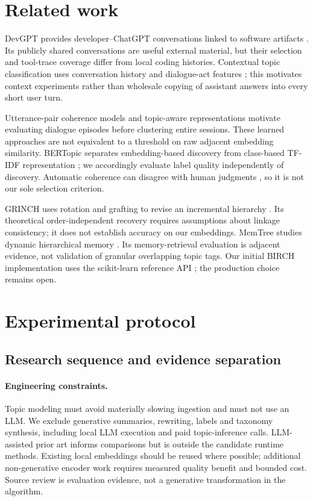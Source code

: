 \documentclass[11pt]{article}
\begin{document}
\section{Related work}
DevGPT provides developer--ChatGPT conversations linked to software artifacts
\cite{devgpt}. Its publicly shared conversations are useful external material,
but their selection and tool-trace coverage differ from local coding histories.
Contextual topic classification uses conversation history and dialogue-act
features \cite{khatri}; this motivates context experiments rather than wholesale
copying of assistant answers into every short user turn.

Utterance-pair coherence models \cite{xing} and topic-aware representations
\cite{gao} motivate evaluating dialogue episodes before clustering entire
sessions. These learned approaches are not equivalent to a threshold on raw
adjacent embedding similarity. BERTopic separates embedding-based discovery
from class-based TF-IDF representation \cite{bertopic}; we accordingly evaluate
label quality independently of discovery. Automatic coherence can disagree with
human judgments \cite{hoyle}, so it is not our sole selection criterion.

GRINCH uses rotation and grafting to revise an incremental hierarchy
\cite{grinch}. Its theoretical order-independent recovery requires assumptions
about linkage consistency; it does not establish accuracy on our embeddings.
MemTree studies dynamic hierarchical memory \cite{memtree}. Its memory-retrieval
evaluation is adjacent evidence, not validation of granular overlapping topic
tags. Our initial BIRCH implementation uses the scikit-learn reference API
\cite{sklearn}; the production choice remains open.

\section{Experimental protocol}
\subsection{Research sequence and evidence separation}
\paragraph{Engineering constraints.}
Topic modeling must avoid materially slowing ingestion and must not use an LLM.
We exclude generative summaries, rewriting, labels and taxonomy synthesis,
including local LLM execution and paid topic-inference calls. LLM-assisted prior
art informs comparisons but is outside the candidate runtime methods. Existing
local embeddings should be reused where possible; additional non-generative
encoder work requires measured quality benefit and bounded cost. Source review
is evaluation evidence, not a generative transformation in the algorithm.
\end{document}

